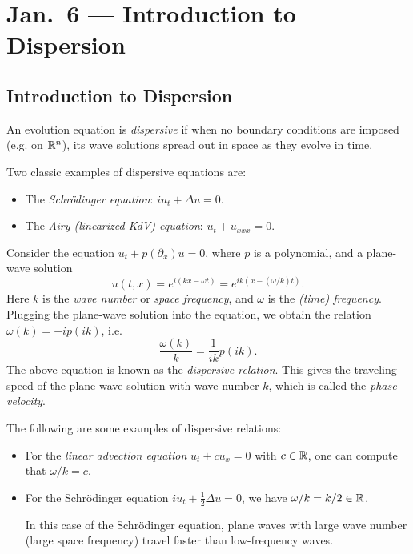 \chapter{Jan.~6 --- Introduction to Dispersion}

\section{Introduction to Dispersion}
\begin{definition}
  An evolution equation is \emph{dispersive} if
  when no boundary conditions are imposed (e.g. on
  $\mathbb{R}^n$), its wave solutions spread out in space
  as they evolve in time.
\end{definition}

\begin{example}
  Two classic examples of dispersive equations are:
  \begin{itemize}
    \item The \emph{Schr\"odinger equation}: $i u_t + \Delta u = 0$.
    \item The \emph{Airy (linearized KdV) equation}:
      $u_t + u_{xxx} = 0$.
  \end{itemize}
\end{example}

\begin{remark}
  Consider the equation
  $u_t + p(\partial_x) u = 0$, where $p$ is a polynomial,
  and a plane-wave solution
  \[
    u(t, x) = e^{i(kx - \omega t)}
    = e^{ik(x - (\omega / k) t)}.
  \]
  Here $k$ is the \emph{wave number} or
  \emph{space frequency}, and $\omega$ is the
  \emph{(time) frequency}. Plugging the plane-wave
  solution into the equation, we obtain the
  relation $\omega(k) = -i p(ik)$, i.e.
  \[
    \frac{\omega(k)}{k} = \frac{1}{ik} p(ik).
  \]
  The above equation is known as the
  \emph{dispersive relation}. This gives the
  traveling speed of the plane-wave solution with
  wave number $k$,
  which is called the \emph{phase velocity}.
\end{remark}

\begin{example}
  The following are some examples of dispersive relations:
  \begin{itemize}
    \item For the \emph{linear advection equation}
      $u_t + c u_x = 0$ with $c \in \mathbb{R}$, one
      can compute that $\omega / k = c$.
    \item For the Schr\"odinger equation
      $i u_t + \frac{1}{2} \Delta u = 0$, we have
      $\omega / k = k / 2 \in \mathbb{R}$.
     
      In this case of the Schr\"odinger equation,
      plane waves with large wave number (large space
      frequency) travel faster than low-frequency waves.
  \end{itemize}
\end{example}

